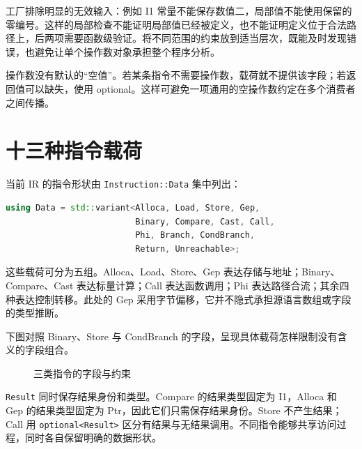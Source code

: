 工厂排除明显的无效输入：例如 I1 常量不能保存数值二，局部值不能使用保留的零编号。这样的局部检查不能证明局部值已经被定义，也不能证明定义位于合法路径上，后两项需要函数级验证。将不同范围的约束放到适当层次，既能及时发现错误，也避免让单个操作数对象承担整个程序分析。

操作数没有默认的“空值”。若某条指令不需要操作数，载荷就不提供该字段；若返回值可以缺失，使用 optional。这样可避免一项通用的空操作数约定在多个消费者之间传播。

\section{十三种指令载荷}
当前 IR 的指令形状由 \texttt{Instruction::Data} 集中列出：
\begin{lstlisting}[language=C++,caption={当前指令的闭合集合}]
using Data = std::variant<Alloca, Load, Store, Gep,
                          Binary, Compare, Cast, Call,
                          Phi, Branch, CondBranch,
                          Return, Unreachable>;
\end{lstlisting}
这些载荷可分为五组。Alloca、Load、Store、Gep 表达存储与地址；Binary、Compare、Cast 表达标量计算；Call 表达函数调用；Phi 表达路径合流；其余四种表达控制转移。此处的 Gep 采用字节偏移，它并不隐式承担源语言数组或字段的类型推断。

下图对照 Binary、Store 与 CondBranch 的字段，呈现具体载荷怎样限制没有含义的字段组合。
\begin{figure}[htbp]\centering
{}
\caption{三类指令的字段与约束}
\end{figure}

\texttt{Result} 同时保存结果身份和类型。Compare 的结果类型固定为 I1，Alloca 和 Gep 的结果类型固定为 Ptr，因此它们只需保存结果身份。Store 不产生结果；Call 用 \texttt{optional<Result>} 区分有结果与无结果调用。不同指令能够共享访问过程，同时各自保留明确的数据形状。

